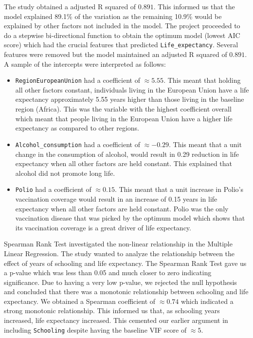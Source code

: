 \documentclass[3pt, a4paper]{article}
\begin{document}
The study obtained a adjusted R squared of $0.891$. This informed us that the model explained 89.1\% of the variation as the remaining 10.9\% would be explained by other factors not included in the model. The project proceeded to do a stepwise bi-directional function to obtain the optimum model (lowest AIC score) which had the crucial features that predicted \texttt{Life\_expectancy}. Several features were removed but the model maintained an adjusted R squared of $0.891$. A sample of the intercepts were interpreted as follows:
\begin{itemize}[noitemsep,topsep=0pt]
    \item \texttt{RegionEuropeanUnion} had a coefficient of $\approx 5.55$. This meant that holding all other factors constant, individuals living in the European Union have a life expectancy approximately 5.55 years higher than those living in the baseline region (Africa). This was the variable with the highest coefficient overall which meant that people living in the European Union have a higher life expectancy as compared to other regions.
    \item \texttt{Alcohol\_consumption} had a coefficient of $\approx -0.29$. This meant that a unit change in the consumption of alcohol, would result in 0.29 reduction in life expectancy when all other factors are held constant. This explained that alcohol did not promote long life.\ 
    \item \texttt{Polio} had a coefficient of $\approx 0.15$. This meant that a unit increase in Polio's vaccination coverage would result in an increase of 0.15 years in life expectancy when all other factors are held constant. Polio was the only vaccination disease that was picked by the optimum model which shows that its vaccination coverage is a great driver of life expectancy.
\end{itemize}

Spearman Rank Test investigated the non-linear relationship in the Multiple Linear Regression. The study wanted to analyze the relationship between the effect of years of schooling and life expectancy. The Spearman Rank Test gave us a p-value which was less than 0.05 and much closer to zero indicating significance. Due to having a very low p-value, we rejected the null hypothesis and concluded that there was a monotonic relationship between schooling and life expectancy. We obtained a Spearman coefficient of $\approx 0.74$ which indicated a strong monotonic relationship. This informed us that, as schooling years increased, life expectancy increased. This cemented our earlier argument in including \texttt{Schooling} despite having the baseline VIF score of $\approx 5$.
\end{document}
